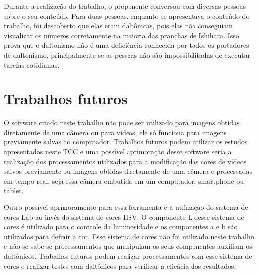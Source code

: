 \documentclass[	12pt, Times, openright, twoside, a4paper, english, brazil]{abntex2}
\begin{document}
Durante a realização do trabalho, o proponente conversou com diversas pessoas sobre o seu conteúdo. Para duas pessoas, enquanto se apresentava o conteúdo do trabalho, foi descoberto que elas eram daltônicas, pois elas não conseguiam visualizar os números corretamente na maioria das pranchas de Ishihara. Isso prova que o daltonismo não é uma deficiência conhecida por todos os portadores de daltonismo, principalmente se as pessoas não são impossibilitadas de executar tarefas cotidianas. 

\section{Trabalhos futuros}

O software criado neste trabalho não pode ser utilizado para imagens obtidas diretamente de uma câmera ou para vídeos, ele só funciona para imagens previamente salvas no computador. Trabalhos futuros podem utilizar os estudos apresentados neste TCC e uma possível aprimoração desse software seria a realização dos processamentos utilizados para a modificação das cores de vídeos salvos previamente ou imagens obtidas diretamente de uma câmera e processadas em tempo real, seja essa câmera embutida em um computador, smartphone ou tablet.

Outro possível aprimoramento para essa ferramenta é a utilização do sistema de cores Lab ao invés do sistema de cores HSV. O componente L desse sistema de cores é utilizado para o controle da luminosidade e os componentes a e b são utilizados para definir a cor. Esse sistema de cores não foi utilizado neste trabalho e não se sabe se processamentos que manipulam os seus componentes auxiliam os daltônicos. Trabalhos futuros podem realizar processamentos com esse sistema de cores e realizar testes com daltônicos para verificar a eficácia dos resultados.


\postextual


%


%
%
\end{document}
